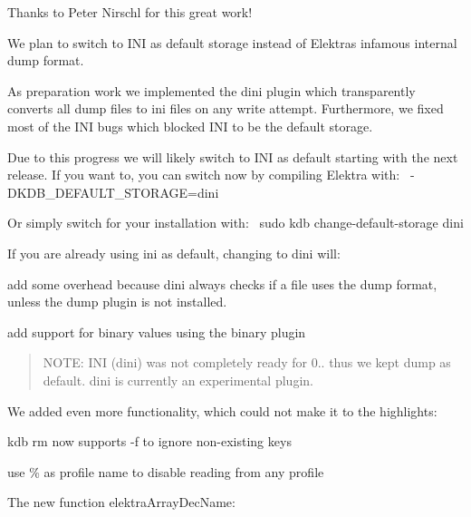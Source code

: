\href{https://asciinema.org/a/153014}{\tt }

Thanks to Peter Nirschl for this great work!

We plan to switch to I\+NI as default storage instead of Elektra\textquotesingle{}s infamous internal dump format.

As preparation work we implemented the {\ttfamily dini} plugin which transparently converts all {\ttfamily dump} files to {\ttfamily ini} files on any write attempt. Furthermore, we fixed most of the I\+NI bugs which blocked I\+NI to be the default storage.

Due to this progress we will likely switch to I\+NI as default starting with the next release. If you want to, you can switch now by compiling Elektra with\+:~\newline
 {\ttfamily -\/\+D\+K\+D\+B\+\_\+\+D\+E\+F\+A\+U\+L\+T\+\_\+\+S\+T\+O\+R\+A\+GE=dini}

Or simply switch for your installation with\+:~\newline
 {\ttfamily sudo kdb change-\/default-\/storage dini}

If you are already using {\ttfamily ini} as default, changing to {\ttfamily dini} will\+:


\begin{DoxyItemize}
\item add some overhead because {\ttfamily dini} always checks if a file uses the {\ttfamily dump} format, unless the {\ttfamily dump} plugin is not installed.
\item add support for binary values using the {\ttfamily binary} plugin
\end{DoxyItemize}

\begin{quote}
N\+O\+TE\+: I\+NI (dini) was not completely ready for 0.. thus we kept {\ttfamily dump} as default. {\ttfamily dini} is currently an experimental plugin. \end{quote}


We added even more functionality, which could not make it to the highlights\+:


\begin{DoxyItemize}
\item {\ttfamily kdb rm} now supports {\ttfamily -\/f} to ignore non-\/existing keys
\item use {\ttfamily \%} as profile name to disable reading from any profile
\item The new function {\ttfamily elektra\+Array\+Dec\+Name}\+:
\end{DoxyItemize}


